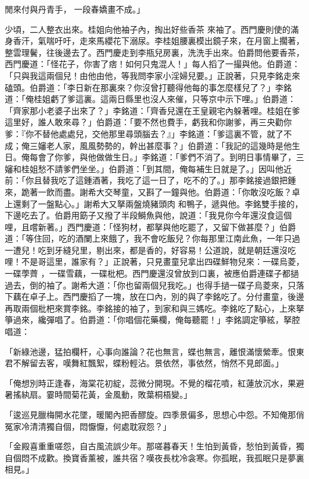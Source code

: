 \begin{showcontents}{}
閒來付與丹青手，  一段春嬌畫不成。」

少頃，二人整衣出來。桂姐向他袖子內，掏出好些香茶 來袖了。西門慶則使的滿身香汗，氣喘吁吁，走來馬纓花下溺尿。李桂姐腰裏模出鏡子來，在月窗上擱著，整雲理鬢，往後邊去了。西門慶走到李瓶兒房裏，洗洗手出來。伯爵問他要香茶，西門慶道：「怪花子，你害了痞！如何只鬼混人！」每人搯了一撮與他。伯爵道：「只與我這兩個兒！由他由他，等我問李家小淫婦兒要。」正說著，只見李銘走來磕頭。伯爵道：「李日新在那裏來？你沒曾打聽得他每的事怎麼樣兒了？」李銘道：「俺桂姐虧了爹這裏。這兩日縣里也沒人來催，只等京中示下哩。」伯爵道：「齊家那小老婆子出來了？」李銘道：「齊香兒還在王皇親宅內躲著哩。桂姐在爹這里好，誰人敢來尋？」伯爵道：「要不然也費手，虧我和你謝爹，再三央勸你爹：『你不替他處處兒，交他那里尋頭腦去？』」李銘道：「爹這裏不管，就了不成；俺三嬸老人家，風風勢勢的，幹出甚麼事？」伯爵道：「我記的這幾時是他生日。俺每會了你爹，與他做做生日。」李銘道：「爹們不消了。到明日事情畢了，三嬸和桂姐愁不請爹們坐坐。」伯爵道：「到其間，俺每補生日就是了。」因叫他近前：「你且替我吃了這鍾酒著，我吃了這一日了，吃不的了。」那李銘接過銀把鍾來，跪著一飲而盡。謝希大交琴童，又斟了一鐘與他。伯爵道：「你敢沒吃飯？卓上還剩了一盤點心。」謝希大又拏兩盤燒豬頭肉 和鴨子，遞與他。李銘雙手接的，下邊吃去了。伯爵用筯子又撥了半段鰣魚與他，說道：「我見你今年還沒食這個哩，且嚐新著。」西門慶道：「怪狗材，都拏與他吃罷了，又留下做甚麼？」伯爵道：「等住回，吃的酒闌上來餓了，我不會吃飯兒？你每那里江南此魚，一年只過一遭兒！吃到牙縫兒里，剔出來，都是香的，好容易！公道說，就是朝廷還沒吃哩！不是哥這里，誰家有？」正說著，只見畫童兒拿出四碟鮮物兒來：一碟烏菱，一碟荸薺 ，一碟雪藕，一碟枇杷。西門慶還沒曾放到口裏，被應伯爵連碟子都撾過去，倒的袖了。謝希大道：「你也留兩個兒我吃。」也得手撾一碟子烏菱來，只落下藕在卓子上。西門慶搯了一塊，放在口內，別的與了李銘吃了。分付畫童，後邊再取兩個枇杷來賞李銘。李銘接的袖了，到家和與三媽吃。李銘吃了點心，上來拏箏過來，纔彈唱了。伯爵道：「你唱個花藥欄，俺每聽罷！」李銘調定箏絃，拏腔唱道：

「新綠池邊，猛拍欄杆，心事向誰論？花也無言，蝶也無言，離恨滿懷縈牽。恨東君不解留去客，嘆舞紅飄絮，蝶粉輕沾。景依然，事依然，悄然不見郎面。」

「俺想別時正逢春，海棠花初綻，蕊微分開現。不覺的榴花噴，紅蓮放沉水，果避暑搖紈扇。霎時間菊花黃，金風動，敗葉桐梧變。」

「逡巡見臘梅開水花墜，暖閣內把香醪旋。四季景偏多，思想心中怨。不知俺那俏冤家冷清清獨自個，悶懨懨，何處耽寂怨？」

「金殿喜重重嗟怨，自古風流誤少年。那嗟暮春天！生怕到黃昏，愁怕到黃昏，獨自個悶不成歡。換寶香薰被，誰共宿？嘆夜長枕冷衾寒。你孤眠，我孤眠只是夢裏相見。」


\end{showcontents}
